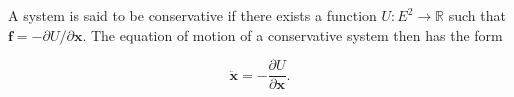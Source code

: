 A system is said to be conservative if there exists a function $U: E^2 \to \mathbb{R}$ such that $\mathbf{f} = -\partial U / \partial \mathbf{x}$. The equation of motion of a conservative system then has the form

$$\ddot{\mathbf{x}} = -\frac{\partial U}{\partial \mathbf{x}}.$$
